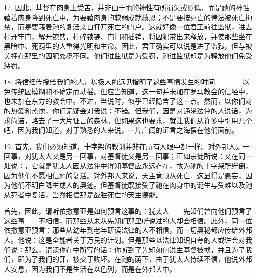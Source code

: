 17. 因此，基督在肉身上受苦，并非由于祂的神性有所损失或贬低，而是祂的神性藉着肉身降到死亡中，为要藉肉身的软弱成就救恩；不是要按死亡的律法被死亡拘禁，而是要藉着祂的复活亲自打开死亡的门户。这就好像一位君王前往监狱，进去打开牢门，解开镣铐，打碎锁链、门闩和插销，将囚犯带出来释放，并使那些坐在黑暗中、死荫里的人重得光明和生命。因此，君王确实可以说是进了监狱，但与被关押在那里的囚犯处境不同。他们进监狱是为受罚，祂进监狱却是为释放他们免受惩罚。\par

18. 将信经传授给我们的人，以极大的远见指明了这些事情发生的时间————以免传统因模糊和不确定而动摇。但应当知道，这一句并未加在罗马教会的信经中，也未加在东方的教会中。不过，当说时，似乎已经隐含了这一点。然而，以你们对的热爱和热忱，你们无疑会对我说：不错。但我们，因是对通晓法律的人说话，为求简洁，略去了一大片证言的森林。但如果这也要求，就让我们从许多中引用几个吧，因为我们知道，对于熟悉的人来说，一片广阔的证言之海摆在他们面前。\par

19. 首先，我们必须知道，十字架的教训并非在所有人眼中都一样。对外邦人是一回事，对犹太人又是另一回事，对基督徒又是另一回事；正如宗徒所说：又在同一处说：，它就是犹太人因从法律中得知基督应永远存在，故为祂的十字架所绊倒，因为他们不愿相信祂的复活。对外邦人来说，天主竟顺从死亡，这显得是愚妄，因为他们不明白降生成人的奥迹。但基督徒既接受了祂在肉身中的诞生与受难以及祂从死者中复活，当然相信那是战胜死亡的天主德能。\par

首先，因此，请听依撒意亚是如何预言这事的：犹太人——先知们曾向他们预言了这些事——不相信，而那些从未从先知们那里听说过的人却会相信。此外，同一位依撒意亚预言：那些从幼年到老年研读法律的人不相信，而一切奥秘都应传给外邦人。他说：这是全能者关于万民的计划。但是那些以法律知识自夸的人或许会对我们说：那么，请读你在中所写的话：你听到了先知如何说主基督被掳，并且为了我们，即为了我们的罪，被交于败坏。在祂的荫下，由于犹太人持续不信，他说外邦人安息，因为我们不是生活在以色列，而是在外邦人中。\par

